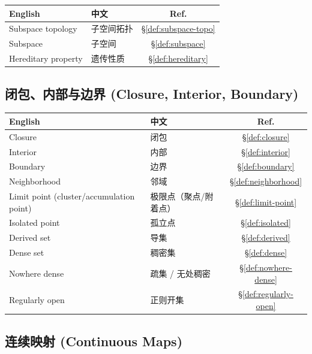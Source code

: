 \documentclass{article}
\begin{document}
\begin{tabular}{@{}lp{7.5cm}c@{}}
  \hline
  \textbf{English} & \textbf{中文} & \textbf{Ref.} \\
  \hline
  Subspace topology                & 子空间拓扑 & \S\ref{def:subspace-topo} \\
  Subspace                         & 子空间 & \S\ref{def:subspace} \\
  Hereditary property              & 遗传性质 & \S\ref{def:hereditary} \\
  \hline
\end{tabular}

\subsection*{闭包、内部与边界 (Closure, Interior, Boundary)}

\begin{tabular}{@{}lp{7.5cm}c@{}}
  \hline
  \textbf{English} & \textbf{中文} & \textbf{Ref.} \\
  \hline
  Closure                          & 闭包 & \S\ref{def:closure} \\
  Interior                         & 内部 & \S\ref{def:interior} \\
  Boundary                         & 边界 & \S\ref{def:boundary} \\
  Neighborhood                     & 邻域 & \S\ref{def:neighborhood} \\
  Limit point (cluster/accumulation point) & 极限点（聚点/附着点）&
  \S\ref{def:limit-point} \\
  Isolated point                   & 孤立点 & \S\ref{def:isolated} \\
  Derived set                      & 导集 & \S\ref{def:derived} \\
  Dense set                        & 稠密集 & \S\ref{def:dense} \\
  Nowhere dense                    & 疏集 / 无处稠密 & \S\ref{def:nowhere-dense} \\
  Regularly open                   & 正则开集 & \S\ref{def:regularly-open} \\
  \hline
\end{tabular}

\subsection*{连续映射 (Continuous Maps)}
\end{document}
